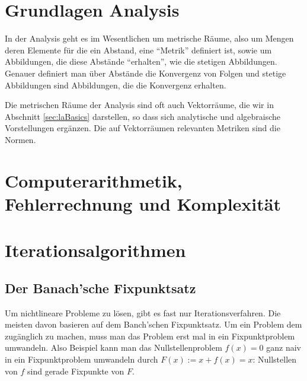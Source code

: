 \documentclass[index=totoc]{scrartcl}%
\theoremstyle{definition}
\begin{document}
\newpage

\section{Grundlagen Analysis}
\label{sec:anaBasics}

In der Analysis geht es im Wesentlichen um metrische Räume,
also um Mengen deren Elemente für die ein Abstand,
eine "`Metrik"' definiert ist,
sowie um Abbildungen, die diese Abstände "`erhalten"',
wie die stetigen Abbildungen.
Genauer definiert man über Abstände die Konvergenz von Folgen
und stetige Abbildungen sind Abbildungen, die die Konvergenz erhalten. 

Die metrischen Räume der Analysis sind oft auch Vektorräume, 
die wir in Abschnitt \ref{sec:laBasics} darstellen, 
so dass sich analytische und algebraische Vorstellungen ergänzen. 
Die auf Vektorräumen relevanten Metriken sind die Normen.


\section{Computerarithmetik, Fehlerrechnung und Komplexität}
\label{sec:arithFail}


\section{Iterationsalgorithmen}\label{sec:iter}


\subsection{Der Banach'sche Fixpunktsatz }

Um nichtlineare Probleme zu lösen, gibt es fast nur Iterationsverfahren.
Die meisten davon basieren auf dem Banch'schen Fixpunktsatz.
Um ein Problem dem zugänglich zu machen,
muss man das Problem erst mal in ein Fixpunktproblem umwandeln.
Also Beispiel kann man das Nullstellenproblem $f(x)=0$
ganz naiv in ein Fixpunktproblem umwandeln durch
$F(x):=x+f(x)=x$: Nullstellen von $f$ sind gerade Fixpunkte von $F$. 
\end{document}
